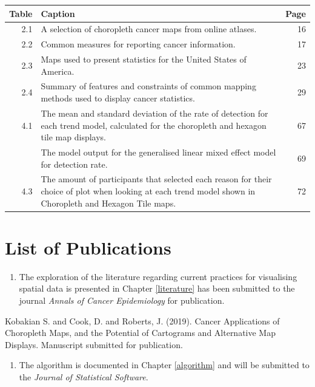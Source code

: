 \documentclass{monashthesis}
\begin{document}
\begin{tabular}{r>{\raggedright\arraybackslash}p{30em}r}
\toprule
Table & Caption & Page\\
\midrule
2.1 & A selection of choropleth cancer maps from online atlases. & 16\\
2.2 & Common measures for reporting cancer information. & 17\\
2.3 & Maps used to present statistics for the United States of America. & 23\\
2.4 & Summary of features and constraints of common mapping methods used to display
cancer statistics. & 29\\
4.1 & The mean and standard deviation of the rate of detection for each trend model, calculated for the choropleth and hexagon tile map displays. & 67\\
\addlinespace
4.2 & The model output for the generalised linear mixed effect model for detection rate. & 69\\
4.3 & The amount of participants that selected each reason for their choice of plot when looking at each trend model shown in Choropleth and Hexagon Tile maps. & 72\\
\bottomrule
\end{tabular}

\hypertarget{list-of-publications}{%
\chapter*{List of Publications}\label{list-of-publications}}

\begin{enumerate}
\def\labelenumi{\arabic{enumi}.}
\tightlist
\item
  The exploration of the literature regarding current practices for visualising spatial data is presented in Chapter \ref{literature} has been submitted to the journal \emph{Annals of Cancer Epidemiology} for publication.
\end{enumerate}

Kobakian S. and Cook, D. and Roberts, J. (2019). Cancer Applications of Choropleth Maps, and the Potential of Cartograms and Alternative Map Displays. Manuscript submitted for publication.

\begin{enumerate}
\def\labelenumi{\arabic{enumi}.}
\setcounter{enumi}{1}
\tightlist
\item
  The algorithm is documented in Chapter \ref{algorithm} and will be submitted to the \emph{Journal of Statistical Software}.
\end{enumerate}
\end{document}
